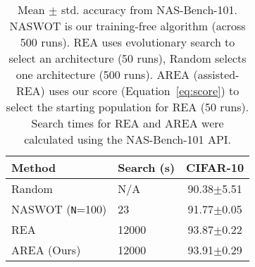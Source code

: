 \documentclass{article}
\begin{document}
\begin{table}
\caption{Mean $\pm$ std. accuracy from NAS-Bench-101. NASWOT is our training-free algorithm (across 500 runs). REA uses evolutionary search to select an architecture (50 runs), Random selects one architecture (500 runs). AREA (assisted-REA) uses our score (Equation~\ref{eq:score}) to select the starting population for REA (50 runs).  Search times for REA and AREA were calculated using the NAS-Bench-101 API.}
\vspace{2mm}
\label{table:benchmarking101}
\centering
    \begin{tabular}{@{}llc@{}} \hline 
    Method & Search (s)  & CIFAR-10 \\
    \midrule
    Random & N/A &  90.38$\pm$5.51 \\
    NASWOT (\texttt{N}=100) & 23  & 91.77$\pm$0.05 \\
    REA      &  12000  & 93.87$\pm$0.22 \\
    AREA (Ours) &  12000  & 93.91$\pm$0.29 \\
    \midrule
    \end{tabular}
\end{table}
\end{document}
